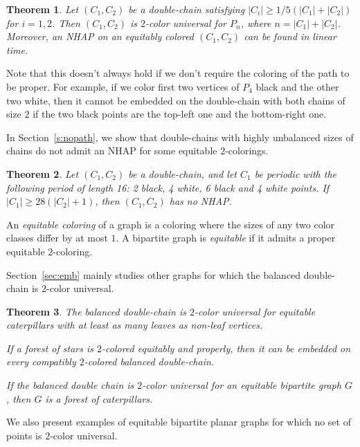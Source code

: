 \documentclass[12pt]{article}
\newtheorem{theorem}{Theorem}[section]
\begin{document}
\begin{theorem}\label{t:main}
Let $(C_1,C_2)$ be a double-chain satisfying $|C_i| \ge 1/5 (|C_1|+|C_2|)$ for $i=1,2$.
Then $(C_1,C_2)$ is $2$-color universal for $P_n$, where $n=|C_1|+|C_2|$. Moreover, an NHAP on an equitably 
colored $(C_1,C_2)$ can be found in linear time.
\end{theorem}

Note that this doesn't always hold if we don't require the coloring of the path to be proper. For example, 
if we color first two vertices of $P_4$ black and the other two white, then it cannot be embedded on the 
double-chain with both chains of size $2$ if the two black points are the top-left one and the bottom-right one.

In Section~\ref{s:nopath}, we show that double-chains with highly unbalanced sizes of chains
do not admit an NHAP for some equitable $2$-colorings.

\begin{theorem} \label{t:nopath}
Let $(C_1,C_2)$ be a double-chain, and let $C_1$ be periodic with the following period of length 16:
2 black, 4 white, 6 black and 4 white points.
If $|C_1| \ge 28(|C_2|+1)$, then $(C_1,C_2)$ has no NHAP.
\end{theorem}

An \emph{equitable coloring} of a graph is a coloring where the sizes of any two color classes differ by at most $1$.
A bipartite graph is \emph{equitable} if it admits a proper equitable $2$-coloring.

Section~\ref{sec:emb} mainly studies other graphs for which the balanced double-chain is $2$-color universal.

\begin{theorem}
\label{thm:eqonbal}
The balanced double-chain is $2$-color universal for equitable caterpillars with at least as many leaves 
as non-leaf vertices. 
\par If a forest of stars is $2$-colored equitably and properly, then it can be embedded on every 
compatibly $2$-colored balanced double-chain.
\par If the balanced double chain is $2$-color universal for an equitable bipartite graph $G$, then
$G$ is a forest of caterpillars.
\end{theorem}

We also present examples of equitable bipartite planar graphs for which no set of points is $2$-color universal.
\end{document}
